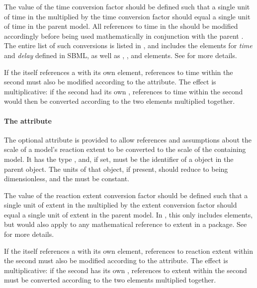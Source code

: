 The value of the time conversion factor should be defined such that a single unit of time in the \Submodel  multiplied by the time conversion factor should equal a single unit of time in the parent model. All references to time in the \Submodel should be modified accordingly before being used mathematically in conjunction with the parent \Model. The entire list of such \sbmlthreecore conversions is listed in , and includes the  elements for \emph{time} and \emph{delay} defined in SBML, as well as \Delay, \RateRule, and \KineticLaw elements.  See  for more details.

If the \Submodel itself references a \Model with its own \Submodel element, references to time within the second \Submodel must also be modified according to the  attribute.  The effect is multiplicative: if the second \Submodel had its own ,  references to time within the second \Submodel would then be converted according to the two  elements multiplied together.


\paragraph{The \fixttspace{} attribute}
\label{submodel-extentconversionfactor}

The optional  attribute is provided to allow references and assumptions about the scale of a model's reaction extent to be converted to the scale of the containing model.  It has the type , and, if set, must be the identifier of a \Parameter object in the parent \Model object.  The units of that \Parameter object, if present, should reduce to being dimensionless, and the \Parameter must be constant.

The value of the reaction extent conversion factor should be defined such that a single unit of extent in the \Submodel multiplied by the extent conversion factor should equal a single unit of extent in the parent model.  In \sbmlthreecore, this only includes \KineticLaw elements, but would also apply to any mathematical reference to extent in a package. See  for more details.

If the \Submodel itself references a \Model with its own \Submodel element, references to reaction extent within the second \Submodel must also be modified according to the  attribute.  The effect is multiplicative: if the second \Submodel has its own , references to extent within the second \Submodel must be converted according to the two  elements multiplied together.


